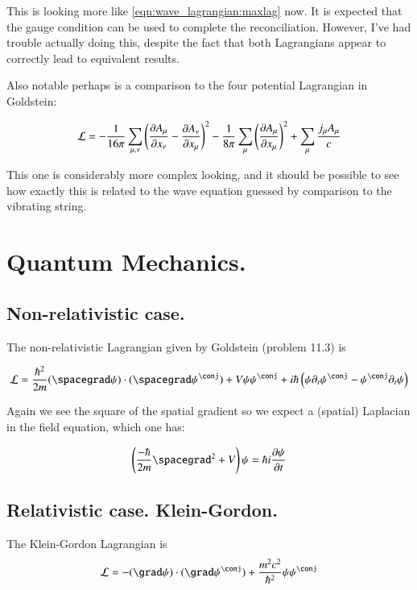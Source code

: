 This is looking more like \ref{eqn:wave_lagrangian:maxlag} now.  It is expected that the gauge condition can be used to complete the reconciliation.  However, I've had trouble actually doing this, despite the fact that both Lagrangians appear to correctly
lead to equivalent results.

Also notable perhaps is a comparison to the four potential Lagrangian in Goldstein:

\begin{align*}
\LL = 
-\inv{16\pi} \sum_{\mu,\nu} \left( 
\PD{x_\nu}{A_\mu} - \PD{x_\mu}{A_\nu} 
\right)^2
-\inv{8\pi} 
\sum_\mu
\left( 
\PD{x_\mu}{A_\mu}
\right)^2
+
\sum_\mu \frac{j_\mu A_\mu}{c}
\end{align*}

This one is considerably more complex looking, and 
it should be possible to see how exactly this is related to the wave
equation guessed by comparison to the vibrating string.

\section{Quantum Mechanics. }

\subsection{Non-relativistic case. }

The non-relativistic Lagrangian given by Goldstein (problem 11.3) is

\begin{align}
\LL = \frac{\hbar^2}{2m}
(\spacegrad \psi) \cdot (\spacegrad \psi^\conj) + V \psi \psi^\conj + {i \hbar} \left( \psi \partial_t \psi^\conj - \psi^\conj \partial_t \psi \right)
\end{align}

Again we see the square of the spatial gradient so we expect a (spatial) Laplacian
in the field equation, which one has:

\begin{align*}
\left( \frac{-\hbar}{2m} \spacegrad^2 + V \right) \psi = \hbar i \PD{t}{\psi}
\end{align*}

\subsection{Relativistic case. Klein-Gordon. }

The Klein-Gordon Lagrangian is
\begin{align*}
\LL 
&= -(\grad \psi) \cdot (\grad \psi^\conj) + \frac{m^2 c^2}{\hbar^2} \psi \psi^\conj \\
\end{align*}

